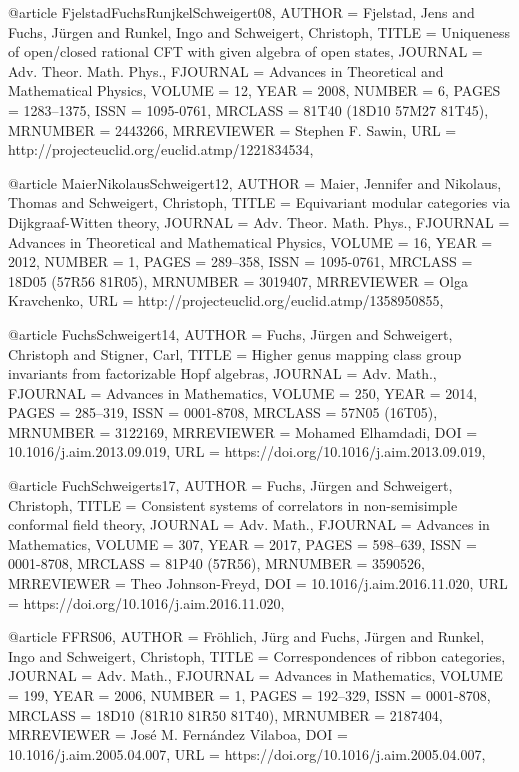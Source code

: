 @article {FjelstadFuchsRunjkelSchweigert08,
    AUTHOR = {Fjelstad, Jens and Fuchs, J\"{u}rgen and Runkel, Ingo and
              Schweigert, Christoph},
     TITLE = {Uniqueness of open/closed rational {CFT} with given algebra of
              open states},
   JOURNAL = {Adv. Theor. Math. Phys.},
  FJOURNAL = {Advances in Theoretical and Mathematical Physics},
    VOLUME = {12},
      YEAR = {2008},
    NUMBER = {6},
     PAGES = {1283--1375},
      ISSN = {1095-0761},
   MRCLASS = {81T40 (18D10 57M27 81T45)},
  MRNUMBER = {2443266},
MRREVIEWER = {Stephen F. Sawin},
       URL = {http://projecteuclid.org/euclid.atmp/1221834534},
}

@article {MaierNikolausSchweigert12,
    AUTHOR = {Maier, Jennifer and Nikolaus, Thomas and Schweigert,
              Christoph},
     TITLE = {Equivariant modular categories via {D}ijkgraaf-{W}itten
              theory},
   JOURNAL = {Adv. Theor. Math. Phys.},
  FJOURNAL = {Advances in Theoretical and Mathematical Physics},
    VOLUME = {16},
      YEAR = {2012},
    NUMBER = {1},
     PAGES = {289--358},
      ISSN = {1095-0761},
   MRCLASS = {18D05 (57R56 81R05)},
  MRNUMBER = {3019407},
MRREVIEWER = {Olga Kravchenko},
       URL = {http://projecteuclid.org/euclid.atmp/1358950855},
}

@article {FuchsSchweigert14,
    AUTHOR = {Fuchs, J\"{u}rgen and Schweigert, Christoph and Stigner, Carl},
     TITLE = {Higher genus mapping class group invariants from factorizable
              {H}opf algebras},
   JOURNAL = {Adv. Math.},
  FJOURNAL = {Advances in Mathematics},
    VOLUME = {250},
      YEAR = {2014},
     PAGES = {285--319},
      ISSN = {0001-8708},
   MRCLASS = {57N05 (16T05)},
  MRNUMBER = {3122169},
MRREVIEWER = {Mohamed Elhamdadi},
       DOI = {10.1016/j.aim.2013.09.019},
       URL = {https://doi.org/10.1016/j.aim.2013.09.019},
}

@article {FuchSchweigerts17,
    AUTHOR = {Fuchs, J\"{u}rgen and Schweigert, Christoph},
     TITLE = {Consistent systems of correlators in non-semisimple conformal
              field theory},
   JOURNAL = {Adv. Math.},
  FJOURNAL = {Advances in Mathematics},
    VOLUME = {307},
      YEAR = {2017},
     PAGES = {598--639},
      ISSN = {0001-8708},
   MRCLASS = {81P40 (57R56)},
  MRNUMBER = {3590526},
MRREVIEWER = {Theo Johnson-Freyd},
       DOI = {10.1016/j.aim.2016.11.020},
       URL = {https://doi.org/10.1016/j.aim.2016.11.020},
}

@article {FFRS06,
    AUTHOR = {Fr\"{o}hlich, J\"{u}rg and Fuchs, J\"{u}rgen and Runkel, Ingo and
              Schweigert, Christoph},
     TITLE = {Correspondences of ribbon categories},
   JOURNAL = {Adv. Math.},
  FJOURNAL = {Advances in Mathematics},
    VOLUME = {199},
      YEAR = {2006},
    NUMBER = {1},
     PAGES = {192--329},
      ISSN = {0001-8708},
   MRCLASS = {18D10 (81R10 81R50 81T40)},
  MRNUMBER = {2187404},
MRREVIEWER = {Jos\'{e} M. Fern\'{a}ndez Vilaboa},
       DOI = {10.1016/j.aim.2005.04.007},
       URL = {https://doi.org/10.1016/j.aim.2005.04.007},
}

